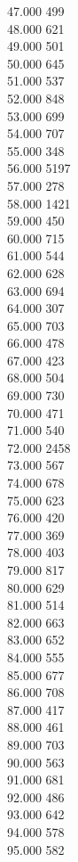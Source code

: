 { 47.000	499 \\
 48.000	621 \\
 49.000	501 \\
 50.000	645 \\
 51.000	537 \\
 52.000	848 \\
 53.000	699 \\
 54.000	707 \\
 55.000	348 \\
 56.000	5197 \\
 57.000	278 \\
 58.000	1421 \\
 59.000	450 \\
 60.000	715 \\
 61.000	544 \\
 62.000	628 \\
 63.000	694 \\
 64.000	307 \\
 65.000	703 \\
 66.000	478 \\
 67.000	423 \\
 68.000	504 \\
 69.000	730 \\
 70.000	471 \\
 71.000	540 \\
 72.000	2458 \\
 73.000	567 \\
 74.000	678 \\
 75.000	623 \\
 76.000	420 \\
 77.000	369 \\
 78.000	403 \\
 79.000	817 \\
 80.000	629 \\
 81.000	514 \\
 82.000	663 \\
 83.000	652 \\
 84.000	555 \\
 85.000	677 \\
 86.000	708 \\
 87.000	417 \\
 88.000	461 \\
 89.000	703 \\
 90.000	563 \\
 91.000	681 \\
 92.000	486 \\
 93.000	642 \\
 94.000	578 \\
 95.000	582 \\
}
